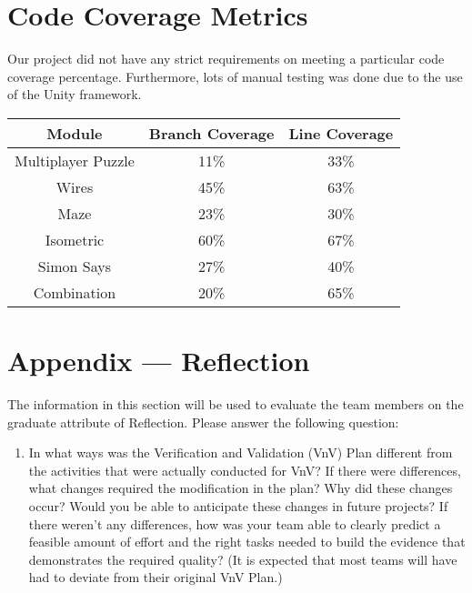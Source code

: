 \documentclass[12pt, titlepage]{article}
\begin{document}
\section{Code Coverage Metrics}
Our project did not have any strict requirements on meeting a particular code coverage percentage. Furthermore, lots of manual testing was done due to the use of the Unity framework.

\begin{table}[H]
\begin{tabular}{|c|c|c|}
\hline
\textbf{Module} & \textbf{Branch Coverage} & \textbf{Line Coverage} \\ \hline
     Multiplayer Puzzle           &     11\%                     &     33\%                   \\ \hline
        Wires        &       45\%                   &            63\%            \\ \hline
        Maze        &       23\%                   &            30\%            \\ \hline
        Isometric        &       60\%                   &            67\%            \\ \hline
        Simon Says        &       27\%                   &            40\%            \\ \hline
        Combination        &       20\%                   &            65\%            \\ \hline
\end{tabular}
\end{table}




\newpage{}
\section{Appendix --- Reflection}

The information in this section will be used to evaluate the team members on the
graduate attribute of Reflection.  Please answer the following question:

\begin{enumerate}
  \item In what ways was the Verification and Validation (VnV) Plan different
  from the activities that were actually conducted for VnV?  If there were
  differences, what changes required the modification in the plan?  Why did
  these changes occur?  Would you be able to anticipate these changes in future
  projects?  If there weren't any differences, how was your team able to clearly
  predict a feasible amount of effort and the right tasks needed to build the
  evidence that demonstrates the required quality?  (It is expected that most
  teams will have had to deviate from their original VnV Plan.)
\end{enumerate}
\end{document}
